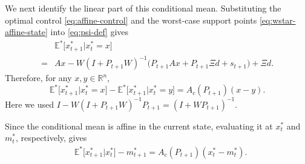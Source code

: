 \documentclass[10pt,journal,twoside]{IEEEtran}
\theoremstyle{definition}
\theoremstyle{remark}
\begin{document}
We next identify the linear part of this conditional mean. Substituting the optimal control \eqref{eq:affine-control} and the worst-case support points \eqref{eq:wstar-affine-state} into \eqref{eq:psi-def} gives
\[
\begin{aligned}
	&\mathbb E^*
	\big[
	x_{t+1}^*
	\big| x_t^*=x
	\big] \\
    =&
	Ax-W(I\!+\!P_{t+1}W)^{-1}
	\big(
	P_{t+1}Ax
	+P_{t+1}\Xi d
	+s_{t+1}
	\big)
	+\Xi d .
\end{aligned}
\]
Therefore, for any \(x,y\in\mathbb R^n\),
\begin{equation*}
		\mathbb E^*
		\big[
		x_{t+1}^*
		\big| x_t^*=x
		\big]
		-
		\mathbb E^*
		\big[
		x_{t+1}^*
		\big| x_t^*=y
		\big]=
		A_c(P_{t+1})(x-y).
\end{equation*}
Here we used
\(
I-W(I+P_{t+1}W)^{-1}P_{t+1}
=
(I+WP_{t+1})^{-1}.
\)

Since the conditional mean is affine in the current state, evaluating
it at \(x_t^*\) and \(m_t^*\), respectively, gives
\begin{equation}
	\begin{aligned}
		&\mathbb E^*
		\big[
		x_{t+1}^*
		\big| x_t^*
		\big]
		-
		m_{t+1}^*  =
		A_c(P_{t+1})
		(x_t^*-m_t^*).
	\end{aligned}
	\label{eq:conditional-mean-centered}
\end{equation}
\end{document}
